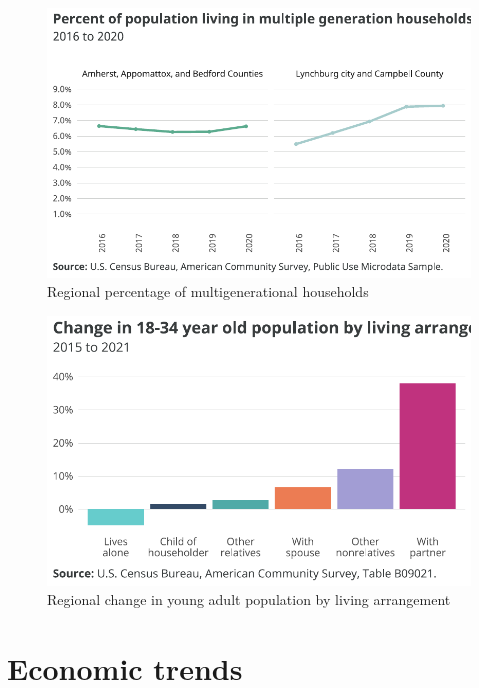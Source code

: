 \documentclass[
  letterpaper,
  DIV=11,
  numbers=noendperiod]{scrreprt}
\begin{document}
\begin{figure}[H]

{\centering \includegraphics{./part-3-1_files/figure-pdf/fig-multigen-1.pdf}

}

\caption{\label{fig-multigen}Regional percentage of multigenerational
households}

\end{figure}

\begin{figure}[H]

{\centering \includegraphics{./part-3-1_files/figure-pdf/fig-adultchild-1.pdf}

}

\caption{\label{fig-adultchild}Regional change in young adult population
by living arrangement}

\end{figure}

\hypertarget{economic-trends}{%
\section{Economic trends}\label{economic-trends}}
\end{document}
